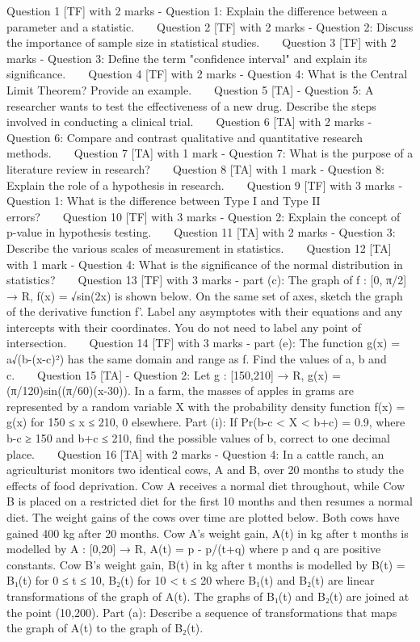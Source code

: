 Question 1 [TF] with 2 marks - Question 1: Explain the difference between a parameter and a statistic.\
\
\
\
Question 2 [TF] with 2 marks - Question 2: Discuss the importance of sample size in statistical studies.\
\
\
\
Question 3 [TF] with 2 marks - Question 3: Define the term "confidence interval" and explain its significance.\
\
\
\
Question 4 [TF] with 2 marks - Question 4: What is the Central Limit Theorem? Provide an example.\
\
\
\
Question 5 [TA] - Question 5: A researcher wants to test the effectiveness of a new drug. Describe the steps involved in conducting a clinical trial.\
\
\
\
Question 6 [TA] with 2 marks - Question 6: Compare and contrast qualitative and quantitative research methods.\
\
\
\
Question 7 [TA] with 1 mark - Question 7: What is the purpose of a literature review in research?\
\
\
\
Question 8 [TA] with 1 mark - Question 8: Explain the role of a hypothesis in research.\
\
\
\
Question 9 [TF] with 3 marks - Question 1: What is the difference between Type I and Type II errors?\
\
\
\
Question 10 [TF] with 3 marks - Question 2: Explain the concept of p-value in hypothesis testing.\
\
\
\
Question 11 [TA] with 2 marks - Question 3: Describe the various scales of measurement in statistics.\
\
\
\
Question 12 [TA] with 1 mark - Question 4: What is the significance of the normal distribution in statistics?\
\
\
\
Question 13 [TF] with 3 marks - part (c): The graph of f : [0, π/2] → R, f(x) = √sin(2x) is shown below. On the same set of axes, sketch the graph of the derivative function f'. Label any asymptotes with their equations and any intercepts with their coordinates. You do not need to label any point of intersection.\
\
\
\
Question 14 [TF] with 3 marks - part (e): The function g(x) = a√(b-(x-c)²) has the same domain and range as f. Find the values of a, b and c.\
\
\
\
Question 15 [TA] - Question 2: Let g : [150,210] → R, g(x) = (π/120)sin((π/60)(x-30)). In a farm, the masses of apples in grams are represented by a random variable X with the probability density function f(x) = {g(x) for 150 ≤ x ≤ 210, 0 elsewhere}. Part (i): If Pr(b-c < X < b+c) = 0.9, where b-c ≥ 150 and b+c ≤ 210, find the possible values of b, correct to one decimal place.\
\
\
\
Question 16 [TA] with 2 marks - Question 4: In a cattle ranch, an agriculturist monitors two identical cows, A and B, over 20 months to study the effects of food deprivation. Cow A receives a normal diet throughout, while Cow B is placed on a restricted diet for the first 10 months and then resumes a normal diet. The weight gains of the cows over time are plotted below. Both cows have gained 400 kg after 20 months. Cow A's weight gain, A(t) in kg after t months is modelled by A : [0,20] → R, A(t) = p - p/(t+q) where p and q are positive constants. Cow B's weight gain, B(t) in kg after t months is modelled by B(t) = {B₁(t) for 0 ≤ t ≤ 10, B₂(t) for 10 < t ≤ 20} where B₁(t) and B₂(t) are linear transformations of the graph of A(t). The graphs of B₁(t) and B₂(t) are joined at the point (10,200). Part (a): Describe a sequence of transformations that maps the graph of A(t) to the graph of B₂(t).\
